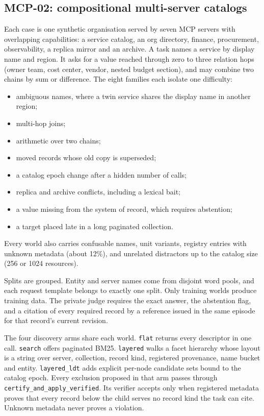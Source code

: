 \subsection{MCP-02: compositional multi-server catalogs}
Each case is one synthetic organisation served by seven MCP servers with overlapping capabilities: a service
catalog, an org directory, finance, procurement, observability, a replica mirror and an archive. A task names a
service by display name and region. It asks for a value reached through zero to three relation hops (owner team,
cost center, vendor, nested budget section), and may combine two chains by sum or difference. The eight families
each isolate one difficulty:
\begin{itemize}
\item ambiguous names, where a twin service shares the display name in another region;
\item multi-hop joins;
\item arithmetic over two chains;
\item moved records whose old copy is superseded;
\item a catalog epoch change after a hidden number of calls;
\item replica and archive conflicts, including a lexical bait;
\item a value missing from the system of record, which requires abstention;
\item a target placed late in a long paginated collection.
\end{itemize}
Every world also carries confusable names, unit variants, registry entries with unknown metadata (about 12\%), and
unrelated distractors up to the catalog size (256 or 1024 resources).

Splits are grouped. Entity and server names come from disjoint word pools, and each request template belongs
to exactly one split. Only training worlds produce training data. The private judge requires the exact answer, the
abstention flag, and a citation of every required record by a reference issued in the same episode for that
record's current revision.

The four discovery arms share each world. \texttt{flat} returns every descriptor in one call. \texttt{search}
offers paginated BM25. \texttt{layered} walks a facet hierarchy whose layout is a string over server, collection,
record kind, registered provenance, name bucket and entity. \texttt{layered\_ldt} adds explicit per-node
candidate sets bound to the catalog epoch. Every exclusion proposed in that arm passes through
\texttt{certify\_and\_apply\_verified}. Its verifier accepts only when registered metadata proves that every record
below the child serves no record kind the task can cite. Unknown metadata never proves a violation.

